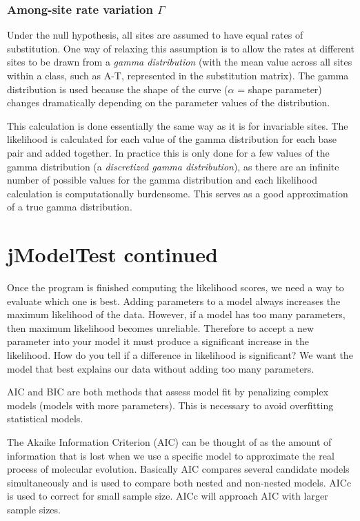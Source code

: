 \documentclass[11pt]{article}
\begin{document}
\subsubsection{Among-site rate variation $\Gamma$}

Under the null hypothesis, all sites are assumed to have equal rates of substitution.  One way of relaxing this assumption is to allow the rates at different sites to be drawn from a \textit{gamma distribution} (with the mean value across all sites within a class, such as A-T, represented in the substitution matrix).  The gamma distribution is used because the shape of the curve ($\alpha$ = shape parameter) changes dramatically depending on the parameter values of the distribution.  

This calculation is done essentially the same way as it is for invariable sites.  
The likelihood is calculated for each value of the gamma distribution for each base pair and added together.  
In practice this is only done for a few values of the gamma distribution
(a \textit{discretized gamma distribution}), 
as there are an infinite number of possible values for the gamma distribution 
and each likelihood calculation is computationally burdensome.  This serves as a good approximation of a true gamma distribution.


\section{jModelTest continued}


Once the program is finished computing the likelihood scores, we need a way to evaluate which one is best.  Adding parameters to a model always increases the maximum likelihood of the data.  However, if a model has too many parameters, then maximum likelihood becomes unreliable.  Therefore to accept a new parameter into your model it must produce a significant increase in the likelihood.  How do you tell if a difference in likelihood is significant?  We want the model that best explains our data without adding too many parameters.

AIC and BIC are both methods that assess model fit by penalizing complex models (models with more parameters).
This is necessary to avoid overfitting statistical models.

The Akaike Information Criterion (AIC) can be thought of as the amount of information that is lost when we use 
a specific model to approximate the real process of molecular evolution.  
Basically AIC compares several candidate models simultaneously and is used to compare both nested and non-nested models.  
AICc is used to correct for small sample size.  AICc will approach AIC with larger sample sizes.
\end{document}
